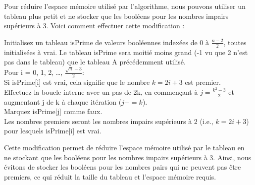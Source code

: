 \documentclass[
    ]{article}
\begin{document}
Pour réduire l'espace mémoire utilisé par l'algorithme, nous pouvons
utiliser un tableau plus petit et ne stocker que les booléens pour les
nombres impairs supérieurs à 3. Voici comment effectuer cette
modification :

Initialisez un tableau isPrime de valeurs booléennes indexées de 0 à
\(\frac{n - 2}{2}\), toutes initialisées à vrai. Le tableau isPrime sera
moitié moins grand (-1 vu que 2 n'est pas dans le tableau) que le
tableau A précédemment utilisé.\\
Pour i = 0, 1, 2, \ldots, \(\frac{\sqrt{n} - 3}{2}\):\\
Si isPrime{[}i{]} est vrai, cela signifie que le nombre \(k = 2i + 3\)
est premier.\\
Effectuez la boucle interne avec un pas de 2k, en commençant à
\(j = \frac{k^2 - 3}{2}\) et augmentant j de k à chaque itération
(\(j += k\)).\\
Marquez isPrime{[}j{]} comme faux.\\
Les nombres premiers seront les nombres impairs supérieurs à 2 (i.e.,
\(k = 2i + 3\)) pour lesquels isPrime{[}i{]} est vrai.

Cette modification permet de réduire l'espace mémoire utilisé par le
tableau en ne stockant que les booléens pour les nombres impairs
supérieurs à 3. Ainsi, nous évitons de stocker les booléens pour les
nombres pairs qui ne peuvent pas être premiers, ce qui réduit la taille
du tableau et l'espace mémoire requis.
\end{document}
